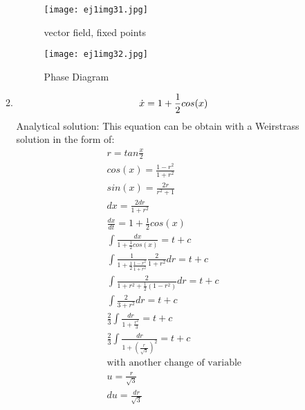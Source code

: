 \documentclass[a4paper,10pt]{article}
\begin{document}
\begin{enumerate}
\begin{enumerate}
		         
		    
		    \begin{figure}[h]
                \centering
                \texttt{[image: ej1img31.jpg]}
                \caption{vector field, fixed points}
                \label{fig:mesh1}
            \end{figure}
            
            
            \begin{figure}[h]
                \centering
                \texttt{[image: ej1img32.jpg]}
                \caption{Phase Diagram}
                \label{fig:mesh1}
            \end{figure}
            
            
        \newpage  
	    \item 
	        \begin{equation}
		        \dot{x}=1+ \frac{1}{2}cos(x)\\
		    \end{equation}
		    Analytical solution:
		    This equation can be obtain with a Weirstrass solution in the form of:
		    \begin{equation}
		        \begin{aligned}
    		        r= tan\frac{x}{2}\\
    		        cos(x)=\frac{1-r^2}{1+r^2}\\
    		        sin(x)=\frac{2r}{r^2+1}\\
    		        dx=\frac{2 dr}{1+r^2}\\
    		        \frac{dx}{dt}=1 + \frac{1}{2}cos(x)\\
    		        \int\frac{dx}{1+\frac{1}{2}cos(x)}= t + c\\
    		        \int\frac{1}{1+\frac{1}{2}\frac{1-r^2}{1+r^2}}\frac{2}{1+ r^2}dr= t + c\\
    		        \int\frac{2}{1 + r^2 + \frac{1}{2}(1-r^2)}dr = t + c\\
    		        \int\frac{2}{3 + r^2}dr= t + c\\
    		        \frac{2}{3}\int\frac{dr}{1 + \frac{r^2}{3}}= t + c\\
    		        \frac{2}{3}\int\frac{dr}{1+(\frac{r}{\sqrt{3}})^2}= t + c\\
    		        \text{with another change of variable}\\
    		        u= \frac{r}{\sqrt{3}}\\
    		        du=\frac{dr}{\sqrt{3}}\\

\end{aligned}
\end{equation}
\end{enumerate}
\end{enumerate}
\end{document}
